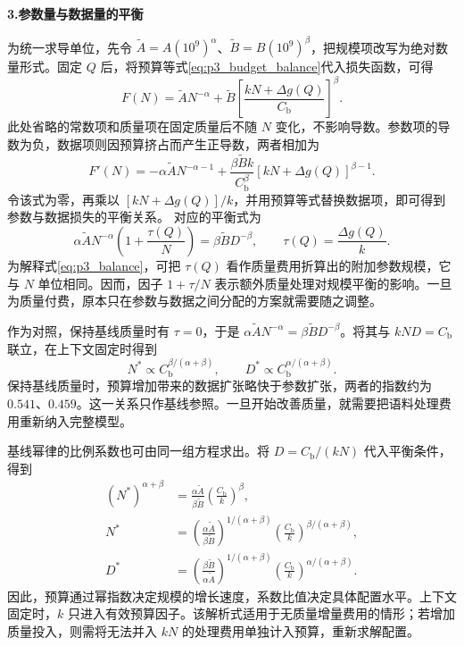 \textbf{3.参数量与数据量的平衡}\par\nopagebreak[4]
为统一求导单位，先令 $\widetilde A=A(10^9)^\alpha$、$\widetilde B=B(10^9)^\beta$，把规模项改写为绝对数量形式。固定 $Q$ 后，将预算等式\eqref{eq:p3_budget_balance}代入损失函数，可得
\[
 F(N)=\widetilde A N^{-\alpha}
      +\widetilde B\left[\frac{kN+\Delta g(Q)}{C_{\mathrm b}}\right]^\beta.
\]
此处省略的常数项和质量项在固定质量后不随 $N$ 变化，不影响导数。参数项的导数为负，数据项则因预算挤占而产生正导数，两者相加为
\begin{equation}
 F'(N)=-\alpha\widetilde A N^{-\alpha-1}
 +\frac{\beta\widetilde Bk}{C_{\mathrm b}^{\beta}}
       [kN+\Delta g(Q)]^{\beta-1}.
 \label{q3_expand_parameter_derivative}
\end{equation}
令该式为零，再乘以 $[kN+\Delta g(Q)]/k$，并用预算等式替换数据项，即可得到参数与数据损失的平衡关系。
对应的平衡式为
\begin{equation}
 \alpha\widetilde A N^{-\alpha}
 \left(1+\frac{\tau(Q)}{N}\right)
 =\beta\widetilde B D^{-\beta},
 \qquad \tau(Q)=\frac{\Delta g(Q)}k.
 \label{eq:p3_balance}
\end{equation}
为解释式\eqref{eq:p3_balance}，可把 $\tau(Q)$ 看作质量费用折算出的附加参数规模，它与 $N$ 单位相同。因而，因子 $1+\tau/N$ 表示额外质量处理对规模平衡的影响。一旦为质量付费，原本只在参数与数据之间分配的方案就需要随之调整。

作为对照，保持基线质量时有 $\tau=0$，于是 $\alpha\widetilde A N^{-\alpha}=\beta\widetilde B D^{-\beta}$。将其与 $kND=C_{\mathrm b}$ 联立，在上下文固定时得到
\begin{equation}
 N^*\propto C_{\mathrm b}^{\beta/(\alpha+\beta)},\qquad
 D^*\propto C_{\mathrm b}^{\alpha/(\alpha+\beta)}.
 \label{eq:p3_scaling}
\end{equation}
保持基线质量时，预算增加带来的数据扩张略快于参数扩张，两者的指数约为 $0.541$、$0.459$。这一关系只作基线参照。一旦开始改善质量，就需要把语料处理费用重新纳入完整模型。

基线幂律的比例系数也可由同一组方程求出。将 $D=C_{\mathrm b}/(kN)$ 代入平衡条件，得到
\begin{equation}
 \begin{aligned}
 (N^*)^{\alpha+\beta}
 &=\frac{\alpha\widetilde A}{\beta\widetilde B}
   \left(\frac{C_{\mathrm b}}{k}\right)^\beta,\\
 N^*&=\left(\frac{\alpha\widetilde A}{\beta\widetilde B}\right)^{1/(\alpha+\beta)}
       \left(\frac{C_{\mathrm b}}{k}\right)^{\beta/(\alpha+\beta)},\\
 D^*&=\left(\frac{\beta\widetilde B}{\alpha\widetilde A}\right)^{1/(\alpha+\beta)}
       \left(\frac{C_{\mathrm b}}{k}\right)^{\alpha/(\alpha+\beta)}.
 \end{aligned}
 \label{q3_expand_baseline_closed_form}
\end{equation}
因此，预算通过幂指数决定规模的增长速度，系数比值决定具体配置水平。上下文固定时，$k$ 只进入有效预算因子。该解析式适用于无质量增量费用的情形；若增加质量投入，则需将无法并入 $kN$ 的处理费用单独计入预算，重新求解配置。

